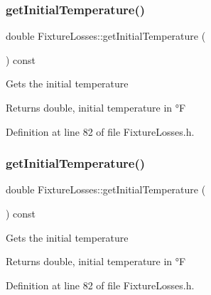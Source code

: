 \mbox{\label{class_fixture_losses_aaa2e1042b71482b377e93d675909f78e}} 
\subsubsection{\texorpdfstring{get\+Initial\+Temperature()}{getInitialTemperature()}\hspace{0.1cm}{\footnotesize\ttfamily [2/3]}}
{\footnotesize\ttfamily double Fixture\+Losses\+::get\+Initial\+Temperature (\begin{DoxyParamCaption}{ }\end{DoxyParamCaption}) const\hspace{0.3cm}{\ttfamily [inline]}}

Gets the initial temperature \begin{DoxyReturn}{Returns}
double, initial temperature in °F 
\end{DoxyReturn}


Definition at line 82 of file Fixture\+Losses.\+h.

\mbox{\label{class_fixture_losses_aaa2e1042b71482b377e93d675909f78e}} 
\subsubsection{\texorpdfstring{get\+Initial\+Temperature()}{getInitialTemperature()}\hspace{0.1cm}{\footnotesize\ttfamily [3/3]}}
{\footnotesize\ttfamily double Fixture\+Losses\+::get\+Initial\+Temperature (\begin{DoxyParamCaption}{ }\end{DoxyParamCaption}) const\hspace{0.3cm}{\ttfamily [inline]}}

Gets the initial temperature \begin{DoxyReturn}{Returns}
double, initial temperature in °F 
\end{DoxyReturn}


Definition at line 82 of file Fixture\+Losses.\+h.

